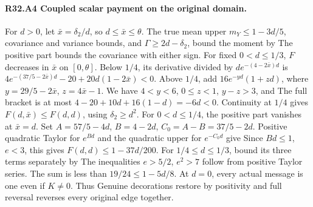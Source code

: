 \paragraph{R32.A4 Coupled scalar payment on the original domain.}
For \(d>0\), let \(\bar x=\delta_2/d\), so \(d\le\bar x\le\theta\).
The true mean upper \(m_Y\le1-3d/5\), covariance and variance bounds,
and \(\Gamma\ge2d-\delta_2\), bound the moment by
The positive part bounds the covariance with either sign. For fixed \(0<d\le1/3\), \(F\) decreases in \(\bar x\) on
\([0,\allowbreak \theta]\). Below \(1/4\), its derivative divided by
\(d e^{-(4-2\bar x)d}\) is
\(4e^{-(37/5-2\bar x)d}-20+20d(1-2\bar x)<0\).
Above \(1/4\), add \(16e^{-yd}(1+zd)\), where
\(y=29/5-2\bar x\), \(z=4\bar x-1\). We have \(4<y<6\),
\(0\le z<1\), \(y-z>3\), and
The full bracket is at most \(4-20+10d+16(1-d)=-6d<0\).
Continuity at \(1/4\) gives \(F(d,\allowbreak \bar x)\le F(d,\allowbreak d)\), using \(\delta_2\ge d^2\).
For \(0<d\le1/4\), the positive part vanishes at \(\bar x=d\).
Set \(A=57/5-4d\), \(B=4-2d\), \(C_0=A-B=37/5-2d\).
Positive quadratic Taylor for \(e^{Bd}\) and the quadratic upper for
\(e^{-C_0d}\) give
Since \(Bd\le1\), \(e<3\), this gives \(F(d,\allowbreak d)\le1-37d/200\).
For \(1/4\le d\le1/3\), bound its three terms separately by
The inequalities \(e>5/2\), \(e^2>7\) follow from positive Taylor
series. The sum is less than \(19/24\le1-5d/8\). At \(d=0\), every
actual message is one even if \(K\ne0\). Thus
Genuine decorations restore by positivity and full reversal reverses
every original edge together.

